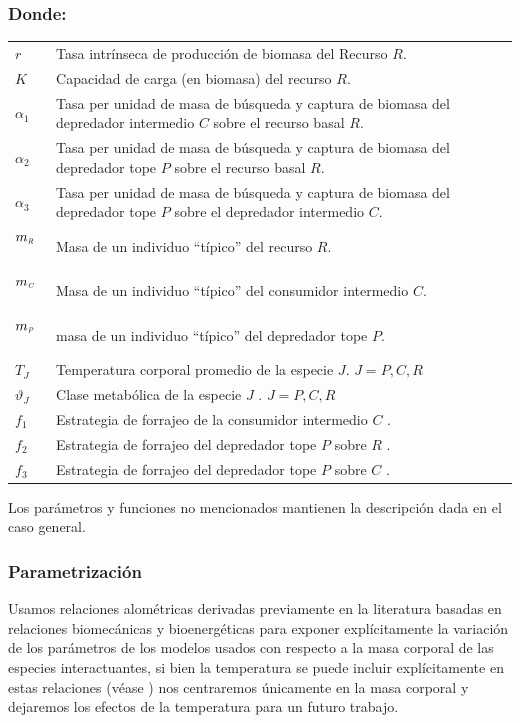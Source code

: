 \subsubsection*{Donde:}
\begin{longtable}{l@{:}p{5.8in}}
$r$  \ & Tasa intr\'inseca de producci\'on de biomasa del Recurso $R$.\\
$K$  \  &Capacidad de carga (en biomasa) del recurso $R$.\\
$\alpha_1$  \ & Tasa per unidad de masa de b\'usqueda y captura de biomasa del depredador intermedio $C$ sobre  el recurso basal $R$.\\
$\alpha_2$ \ & Tasa per unidad de masa  de b\'usqueda y captura de biomasa del depredador tope $P$ sobre  el recurso basal $R$.\\
$\alpha_3$ \  &Tasa per unidad de masa de b\'usqueda y captura de biomasa del depredador tope $P$ sobre  el depredador intermedio $C$.\\
$m_{\textit{\tiny R}}$  \ & Masa de un individuo ``t\'ipico'' del recurso $R$.\\
$m_{\textit{\tiny C}}$  \ & Masa de un individuo ``t\'ipico'' del consumidor intermedio $C$.\\
$m_\textit{\tiny P}$  \ & masa de un individuo ``t\'ipico'' del depredador tope $P$.\\
$T_J$ \ & Temperatura corporal promedio de la especie $J$. $J = P,C,R$ \\
$\vartheta_J$ \ & Clase metab\'olica de la especie $J$ . $J = P,C,R$ \\
$f_1$ \ & Estrategia de forrajeo de la consumidor intermedio $C$ .\\
$f_2$ \ & Estrategia de forrajeo del depredador tope $P$ sobre $R$ .\\
$f_3$ \ & Estrategia de forrajeo del depredador tope $P$ sobre $C$ .\\

\end{longtable}

Los par\'ametros y funciones no mencionados mantienen la descripci\'on dada en el caso general.
\subsubsection{Parametrizaci\'on}
Usamos relaciones alom\'etricas derivadas previamente en la literatura basadas en relaciones biomec\'anicas y bioenerg\'eticas \citep{savage2004predominance,brown2004toward,west1997general,savage2004effects,pawar2012dimensionality,mcgill2006allometric,peters1986ecological,kiltie2000scaling,yodzis1992body} para exponer expl\'icitamente la variaci\'on de los par\'ametros de los modelos usados con respecto a la masa corporal de las especies interactuantes,  si bien la temperatura se puede incluir expl\'icitamente en estas relaciones (v\'ease \citealt{brown2004toward,savage2004effects}) nos centraremos \'unicamente en la masa corporal y dejaremos los efectos de la temperatura para un futuro trabajo.

